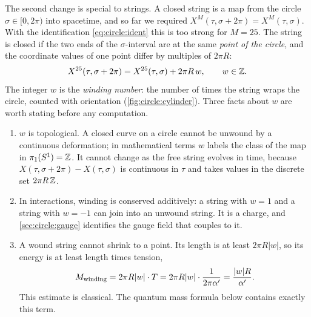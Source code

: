 The second change is special to strings. A closed string is a map from the circle
$\sigma\in[0,2\pi)$ into spacetime, and so far we required
$X^M(\tau,\sigma+2\pi)=X^M(\tau,\sigma)$. With the identification \eqref{eq:circle:ident} this
is too strong for $M=25$. The string is closed if the two ends of the $\sigma$-interval are at
the same \emph{point of the circle}, and the coordinate values of one point differ by multiples
of $2\pi R$:
\begin{equation}\label{eq:circle:windingbc}
 X^{25}(\tau,\sigma+2\pi)=X^{25}(\tau,\sigma)+2\pi R\,w,\qquad w\in\mathbb{Z} .
\end{equation}
The integer $w$ is the \emph{winding number}: the number of times the
string wraps the circle, counted with orientation (\cref{fig:circle:cylinder}). Three facts
about $w$ are worth stating before any computation.
\begin{enumerate}[leftmargin=*]
\item $w$ is topological. A closed curve on a circle cannot be unwound by a continuous
deformation; in mathematical terms $w$ labels the class of the map in
$\pi_1(S^1)=\mathbb{Z}$. It cannot change as the free string evolves in time, because
$X(\tau,\sigma+2\pi)-X(\tau,\sigma)$ is continuous in $\tau$ and takes values in the discrete
set $2\pi R\,\mathbb{Z}$.
\item In interactions, winding is conserved additively: a string with $w=1$ and a string with
$w=-1$ can join into an unwound string. It is a charge, and
\cref{sec:circle:gauge} identifies the gauge field that couples to it.
\item A wound string cannot shrink to a point. Its length is at least $2\pi R|w|$, so its
energy is at least length times tension,
\begin{equation}\label{eq:circle:windingenergy}
 M_{\text{winding}}=2\pi R|w|\cdot T=2\pi R|w|\cdot\frac{1}{2\pi\alpha'}=\frac{|w|R}{\alpha'}.
\end{equation}
This estimate is classical. The quantum mass formula below contains exactly this term.
\end{enumerate}

